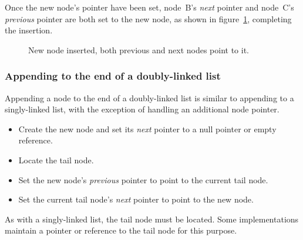 \documentclass{article}
\begin{document}
  Once the new node's pointer have been set, node~B's \emph{next} pointer and node~C's \emph{previous} pointer are both set to the new node, as shown in figure~\ref{fig:doublelinkedlist-insert-step-three}, completing the insertion.
  \begin{figure}[H]
    \centering
    \caption{New node inserted, both previous and next nodes point to it.}
    \label{fig:doublelinkedlist-insert-step-three}
  \end{figure}

  \subsubsection{Appending to the end of a doubly-linked list}
  Appending a node to the end of a doubly-linked list is similar to appending to a singly-linked list, with the exception of handling an additional node pointer.
  \begin{itemize}
    \item Create the new node and set its \emph{next} pointer to a null pointer or empty reference.
    \item Locate the tail node.
    \item Set the new node's \emph{previous} pointer to point to the current tail node.
    \item Set the current tail node's \emph{next} pointer to point to the new node.
  \end{itemize}
  As with a singly-linked list, the tail node must be located. Some implementations maintain a pointer or reference to the tail node for this purpose.
\end{document}
